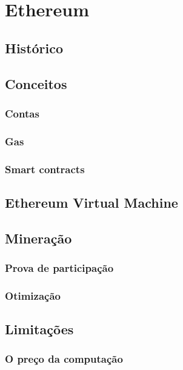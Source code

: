 \documentclass[tcc,capa]{texufpel}
\begin{document}
\section{Ethereum}

	\subsection{Histórico}

	\subsection{Conceitos}
    
    	\subsubsection{Contas}
    
    	\subsubsection{Gas}
        
        \subsubsection{Smart contracts}

	\subsection{Ethereum Virtual Machine}
    
    \subsection{Mineração}
    
    	\subsubsection{Prova de participação}
        
        \subsubsection{Otimização}
    
    \subsection{Limitações}
    
    	\subsubsection{O preço da computação}
        
\end{document}

